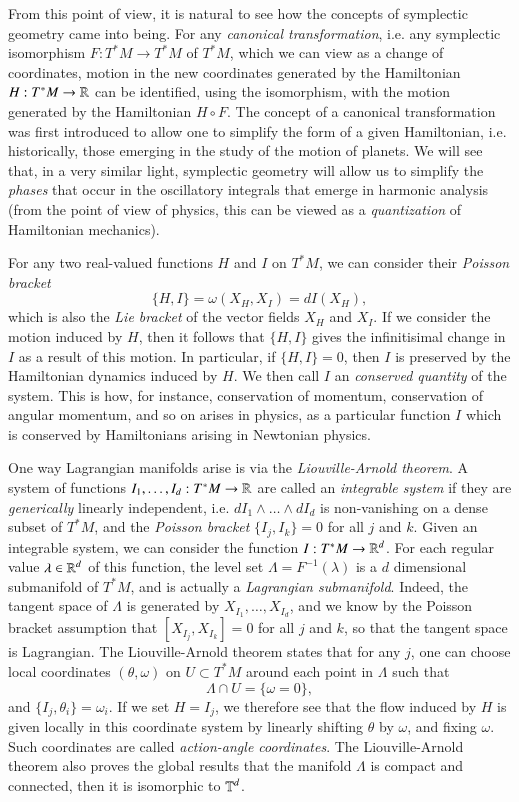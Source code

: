 From this point of view, it is natural to see how the concepts of symplectic geometry came into being. For any \emph{canonical transformation}, i.e. any symplectic isomorphism $F: T^* M \to T^* M$ of $T^* M$, which we can view as a change of coordinates, motion in the new coordinates generated by the Hamiltonian $H: T^* M \to \operatorname{\mathbb{R}}$ can be identified, using the isomorphism, with the motion generated by the Hamiltonian $H \circ F$. The concept of a canonical transformation was first introduced to allow one to simplify the form of a given Hamiltonian, i.e. historically, those emerging in the study of the motion of planets. We will see that, in a very similar light, symplectic geometry will allow us to simplify the \emph{phases} that occur in the oscillatory integrals that emerge in harmonic analysis (from the point of view of physics, this can be viewed as a \emph{quantization} of Hamiltonian mechanics).

For any two real-valued functions $H$ and $I$ on $T^* M$, we can consider their \emph{Poisson bracket}
%
\[ \{ H, I \} = \omega( X_H, X_I ) = dI(X_H), \]
%
which is also the \emph{Lie bracket} of the vector fields $X_H$ and $X_I$. If we consider the motion induced by $H$, then it follows that $\{ H, I \}$ gives the infinitisimal change in $I$ as a result of this motion. In particular, if $\{ H, I \} = 0$, then $I$ is preserved by the Hamiltonian dynamics induced by $H$. We then call $I$ an \emph{conserved quantity} of the system. This is how, for instance, conservation of momentum, conservation of angular momentum, and so on arises in physics, as a particular function $I$ which is conserved by Hamiltonians arising in Newtonian physics.

One way Lagrangian manifolds arise is via the \emph{Liouville-Arnold theorem}. A system of functions $I_1,\dots,I_d: T^* M \to \operatorname{\mathbb{R}}$ are called an \emph{integrable system} if they are \emph{generically} linearly independent, i.e. $dI_1 \wedge \dots \wedge dI_d$ is non-vanishing on a dense subset of $T^* M$, and the \emph{Poisson bracket} $\{ I_j, I_k \} = 0$ for all $j$ and $k$. Given an integrable system, we can consider the function $I: T^* M \to \operatorname{\mathbb{R}}^d$. For each regular value $\lambda \in \operatorname{\mathbb{R}}^d$ of this function, the level set $\Lambda = F^{-1}(\lambda)$ is a $d$ dimensional submanifold of $T^* M$, and is actually a \emph{Lagrangian submanifold}. Indeed, the tangent space of $\Lambda$ is generated by $X_{I_1}, \dots, X_{I_d}$, and we know by the Poisson bracket assumption that $[X_{I_j}, X_{I_k}] = 0$ for all $j$ and $k$, so that the tangent space is Lagrangian. The Liouville-Arnold theorem states that for any $j$, one can choose local coordinates $(\theta, \omega)$ on $U \subset T^* M$ around each point in $\Lambda$ such that
%
\[ \Lambda \cap U = \{ \omega = 0 \}, \]
%
and $\{ I_j, \theta_i \} = \omega_i$. If we set $H = I_j$, we therefore see that the flow induced by $H$ is given locally in this coordinate system by linearly shifting $\theta$ by $\omega$, and fixing $\omega$. Such coordinates are called \emph{action-angle coordinates}. The Liouville-Arnold theorem also proves the global results that the manifold $\Lambda$ is compact and connected, then it is isomorphic to $\operatorname{\mathbb{T}}^d$.

